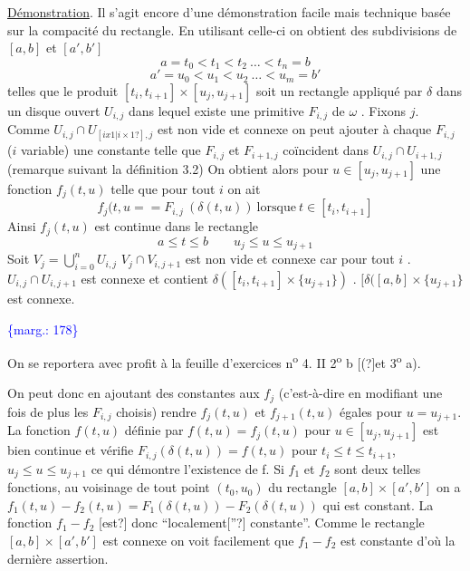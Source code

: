\documentclass[11pt]{article}
\newcommand{\scanpage}[1]{\par\bigskip\noindent{\small\sffamily[scan #1]}\par}
\newcommand{\mspage}[1]{{\small\sffamily[p.\,#1]}}
\newcommand{\margin}[1]{\textcolor{blue}{\{\textsf{marg.:} #1\}}}
\newcommand{\uline}[1]{\underline{#1}}
\newcommand{\unsure}[1]{[#1?]}
\begin{document}
\uline{Démonstration}. Il s'agit encore d'une démonstration facile mais technique
basée sur la compacité du rectangle. En utilisant celle-ci on obtient des
subdivisions de $[a,b]$ et $[a',b']$
\[ a = t_0 < t_1 < t_2 \ \dots < t_n = b \]
\[ a' = u_0 < u_1 < u_2 \ \dots < u_m = b' \]
telles que le produit $[t_i, t_{i+1}] \times [u_j, u_{j+1}]$ soit un rectangle appliqué
par $\delta$ dans un disque ouvert $U_{i,j}$ dans lequel existe une primitive $F_{i,j}$
de $\omega$ . Fixons $j$. Comme $U_{i,j} \cap U_{\unsure{ix1|i\times 1},j}$ est non vide et connexe on peut
ajouter à chaque $F_{i,j}$ ($i$ variable) une constante telle que $F_{i,j}$ et
$F_{i+1,j}$ coïncident dans $U_{i,j} \cap U_{i+1, j}$ (remarque suivant la définition 3.2)
On obtient alors pour $u \in [u_j, u_{j+1}]$ une fonction $f_j(t,u)$ telle que
pour tout $i$ on ait
\[ f_j(t,u= = F_{i,j} \ (\delta(t,u)) \ \text{lorsque} \ t \in [t_i, t_{i+1}] \]
Ainsi $f_j(t,u)$ est continue dans le rectangle
\[ a \leq t \leq b \qquad u_j \leq u \leq u_{j+1} \]
Soit $V_j = \bigcup_{i=0}^{n} U_{i,j}$
$V_j \cap V_{i,j+1}$ est non vide et connexe car pour tout $i$ . $U_{i,j} \cap U_{i,j+1}$ est
connexe et contient $\delta([t_i,t_{i+1}] \times \{u_{j+1}\})$ . $[\delta([a,b] \times \{u_{j+1}\}$ est connexe.

\margin{178}

\clearpage
\scanpage{119/179}
\mspage{- 18 -}

On se reportera avec profit à la feuille d'exercices n\textsuperscript{o} 4. II 2\textsuperscript{o} b \unsure{(}et 3\textsuperscript{o} a).

On peut donc en ajoutant des constantes aux $f_j$ (c'est-à-dire en
modifiant une fois de plus les $F_{i,j}$ choisis) rendre $f_j(t,u)$ et $f_{j+1}(t,u)$
égales pour $u = u_{j+1}$. La fonction $f(t,u)$ définie par $f(t,u) = f_j(t,u)$
pour $u \in [u_j, u_{j+1}]$ est bien continue et vérifie $F_{i,j}(\delta(t,u)) = f(t,u)$
pour $t_i \leq t \leq t_{i+1}$, $u_j \leq u \leq u_{j+1}$ ce qui démontre l'existence de f.
Si $f_1$ et $f_2$ sont deux telles fonctions, au voisinage de tout point $(t_0,u_0)$
du rectangle $[a,b] \times [a',b']$ on a
$f_1(t,u) - f_2(t,u) = F_1(\delta(t,u)) - F_2(\delta(t,u))$ qui est constant. La
fonction $f_1-f_2$ \unsure{est} donc ``localement\unsure{''} constante''. Comme le rectangle
$[a,b] \times [a',b']$ est connexe on voit facilement que $f_1-f_2$ est constante
d'où la dernière assertion.
\end{document}
